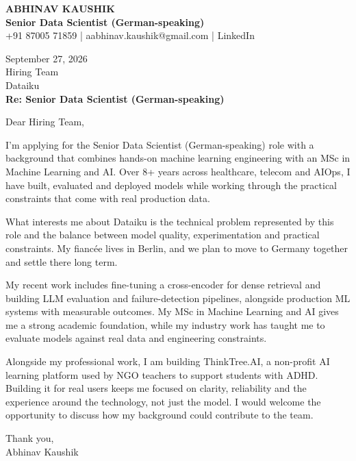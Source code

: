 \documentclass[10pt,a4paper]{article}
\begin{document}
\begin{center}
{\Large\bfseries ABHINAV KAUSHIK}\\[2pt]
{\bfseries Senior Data Scientist (German-speaking)}\\[2pt]
+91 87005 71859 \quad | \quad aabhinav.kaushik@gmail.com \quad | \quad LinkedIn
\end{center}
\vspace{8pt}
September 27, 2026\\[6pt]
Hiring Team\\
Dataiku\\[4pt]
\textbf{Re: Senior Data Scientist (German-speaking)}

Dear Hiring Team,

I’m applying for the Senior Data Scientist (German-speaking) role with a background that combines hands-on machine learning engineering with an MSc in Machine Learning and AI. Over 8+ years across healthcare, telecom and AIOps, I have built, evaluated and deployed models while working through the practical constraints that come with real production data.

What interests me about Dataiku is the technical problem represented by this role and the balance between model quality, experimentation and practical constraints. My fiancée lives in Berlin, and we plan to move to Germany together and settle there long term.

My recent work includes fine-tuning a cross-encoder for dense retrieval and building LLM evaluation and failure-detection pipelines, alongside production ML systems with measurable outcomes. My MSc in Machine Learning and AI gives me a strong academic foundation, while my industry work has taught me to evaluate models against real data and engineering constraints.

Alongside my professional work, I am building ThinkTree.AI, a non-profit AI learning platform used by NGO teachers to support students with ADHD. Building it for real users keeps me focused on clarity, reliability and the experience around the technology, not just the model. I would welcome the opportunity to discuss how my background could contribute to the team.

Thank you,\\
Abhinav Kaushik
\end{document}
